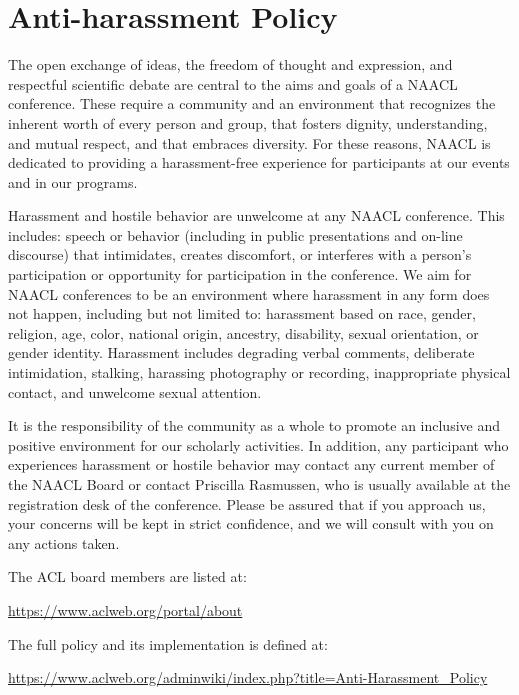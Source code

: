 \chapter[Anti-harassment Policy]{Anti-harassment Policy}

The open exchange of ideas, the freedom of thought and expression, and
respectful scientific debate are central to the aims and goals of a
NAACL conference. These require a community and an environment that
recognizes the inherent worth of every person and group, that fosters
dignity, understanding, and mutual respect, and that embraces
diversity. For these reasons, NAACL is dedicated to providing a
harassment-free experience for participants at our events and in our
programs. 

Harassment and hostile behavior are unwelcome at any NAACL
conference. This includes: speech or behavior (including in public
presentations and on-line discourse) that intimidates, creates
discomfort, or interferes with a person’s participation or opportunity
for participation in the conference. We aim for NAACL conferences to
be an environment where harassment in any form does not happen,
including but not limited to: harassment based on race, gender,
religion, age, color, national origin, ancestry, disability, sexual
orientation, or gender identity. Harassment includes degrading verbal
comments, deliberate intimidation, stalking, harassing photography or
recording, inappropriate physical contact, and unwelcome sexual
attention. 

It is the responsibility of the community as a whole to promote an
inclusive and positive environment for our scholarly activities. In
addition, any participant who experiences harassment or hostile
behavior may contact any current member of the NAACL Board or contact
Priscilla Rasmussen, who is usually available at the registration desk
of the conference. Please be assured that if you approach us, your
concerns will be kept in strict confidence, and we will consult with
you on any actions taken. 

The ACL board members are listed at:

\url{https://www.aclweb.org/portal/about}

The full policy and its implementation is defined at:

\url{https://www.aclweb.org/adminwiki/index.php?title=Anti-Harassment_Policy}
